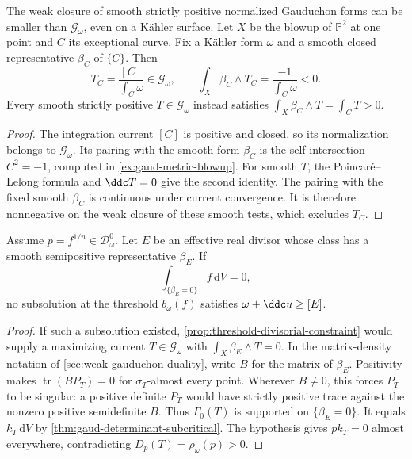 \begin{example}\label{ex:gauduchon-current-smoothing-obstruction}
The weak closure of smooth strictly positive normalized Gauduchon forms can be smaller than $\mathscr G_\omega$, even on a K\"ahler surface. Let $X$ be the blowup of $\mathbb P^2$ at one point and $C$ its exceptional curve. Fix a K\"ahler form $\omega$ and a smooth closed representative $\beta_C$ of $\{C\}$. Then
\[
 T_C=\frac{[C]}{\int_C\omega}\in\mathscr G_\omega,
 \qquad
 \int_X\beta_C\wedge T_C=\frac{-1}{\int_C\omega}<0.
\]
Every smooth strictly positive $T\in\mathscr G_\omega$ instead satisfies
$\int_X\beta_C\wedge T=\int_C T>0$.
\end{example}
\begin{proof}
The integration current $[C]$ is positive and closed, so its normalization belongs to $\mathscr G_\omega$. Its pairing with the smooth form $\beta_C$ is the self-intersection $C^2=-1$, computed in \cref{ex:gaud-metric-blowup}. For smooth $T$, the Poincar\'e--Lelong formula and $\ddc T=0$ give the second identity. The pairing with the fixed smooth $\beta_C$ is continuous under current convergence. It is therefore nonnegative on the weak closure of these smooth tests, which excludes $T_C$.
\end{proof}

\begin{corollary}\label{cor:semipositive-divisor-exclusion}
Assume $p=f^{1/n}\in\mathcal D_\omega^0$. Let $E$ be an effective real divisor whose class has a smooth semipositive representative $\beta_E$. If
\[
 \int_{\{\beta_E=0\}}f\,\mathrm{d}V=0,
\]
no subsolution at the threshold $b_\omega(f)$ satisfies $\omega+\ddc u\geq[E]$.
\end{corollary}
\begin{proof}
If such a subsolution existed, \cref{prop:threshold-divisorial-constraint} would supply a maximizing current $T\in\mathscr G_\omega$ with $\int_X\beta_E\wedge T=0$. In the matrix-density notation of \cref{sec:weak-gauduchon-duality}, write $B$ for the matrix of $\beta_E$. Positivity makes $\operatorname{tr}(BP_T)=0$ for $\sigma_T$-almost every point. Wherever $B\ne0$, this forces $P_T$ to be singular: a positive definite $P_T$ would have strictly positive trace against the nonzero positive semidefinite $B$. Thus $\Gamma_0(T)$ is supported on $\{\beta_E=0\}$. It equals $k_T\,\mathrm{d}V$ by \cref{thm:gaud-determinant-subcritical}. The hypothesis gives $p k_T=0$ almost everywhere, contradicting $D_p(T)=\rho_\omega(p)>0$.
\end{proof}

